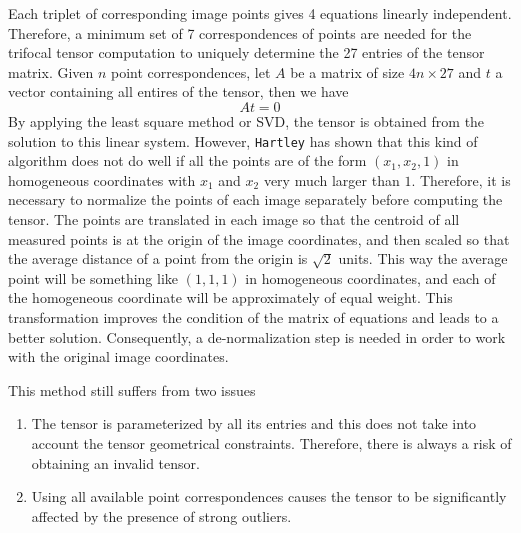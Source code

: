 Each triplet of corresponding image points gives 4 equations linearly independent. Therefore, a minimum set of 7 correspondences of points are needed for the trifocal tensor computation to uniquely determine the 27 entries of the tensor matrix. Given $n$ point correspondences, let $A$ be a matrix of size $4n \times 27$ and $t$ a vector containing all entires of the tensor, then we have
\begin{equation}
  At = 0
  \label{eq:tensorsvd}
\end{equation}
By applying the least square method or SVD, the tensor is obtained from the solution to this linear system. However, \texttt{Hartley} has shown that this kind of algorithm does not do well if all the points are of the form $(x_1, x_2, 1)$ in homogeneous coordinates with $x_1$ and $x_2$ very much larger than $1$. Therefore, it is necessary to normalize the points of each image separately before computing the tensor. The points are translated in each image so that the centroid of all measured points is at the origin of the image coordinates, and then scaled so that the average distance of a point from the origin is $\sqrt{2}$ units. This way the average point will be something like $(1, 1 ,1)$ in homogeneous coordinates, and each of the homogeneous coordinate will be approximately of equal weight. This transformation improves the condition of the matrix of equations and leads to a better solution. Consequently, a de-normalization step is needed in order to work with the original image coordinates.

This method still suffers from two issues
\begin{enumerate}
  \item The tensor is parameterized by all its entries and this does not take into account the tensor geometrical constraints. Therefore, there is always a risk of obtaining an invalid tensor.
  \item Using all available point correspondences causes the tensor to be significantly affected by the presence of strong outliers.
\end{enumerate}

